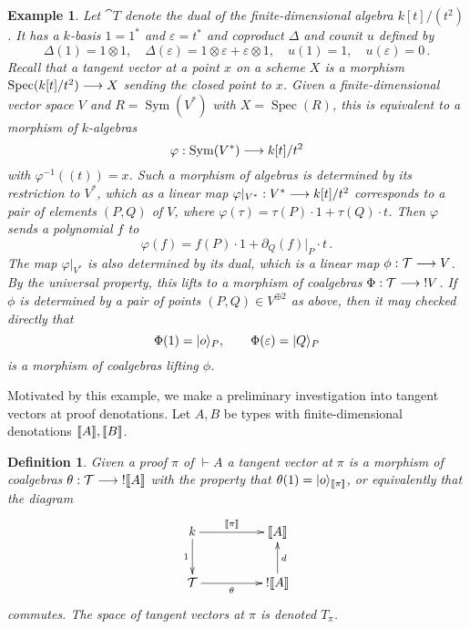 \documentclass[english,letter paper,12pt,reqno]{article}
\DeclarePairedDelimiter\ket{\lvert}{\rangle}
\theoremstyle{example}
\newtheorem{definition}[theorem]{Definition}
\newtheorem{example}[theorem]{Example}
\numberwithin{equation}{section}
\DeclareMathOperator{\Spec}{Spec}
\DeclareMathOperator{\Sym}{Sym}
\begin{document}
\begin{example}\label{example:tangent_coalgebra} Let $\cat{T}$ denote the dual of the finite-dimensional algebra $k[t]/(t^2)$. It has a $k$-basis $1 = 1^*$ and $\varepsilon = t^*$ and coproduct $\Delta$ and counit $u$ defined by
\[
\Delta(1) = 1 \otimes 1, \quad \Delta( \varepsilon ) = 1 \otimes \varepsilon + \varepsilon \otimes 1, \quad u(1) = 1, \quad u(\varepsilon) = 0\,.
\]
Recall that a tangent vector at a point $x$ on a scheme $X$ is a morphism $\Spec(k[t]/t^2) \lto X$ sending the closed point to $x$. Given a finite-dimensional vector space $V$ and $R = \Sym(V^*)$ with $X = \Spec(R)$, this is equivalent to a morphism of $k$-algebras
\[
\varphi: \Sym(V^*) \lto k[t]/t^2
\]
with $\varphi^{-1}( (t) ) = x$. Such a morphism of algebras is determined by its restriction to $V^*$, which as a linear map $\varphi|_{V^*}: V^* \longrightarrow k[t]/t^2$ corresponds to a pair of elements $(P, Q)$ of $V$, where $\varphi( \tau ) = \tau(P) \cdot 1 + \tau(Q) \cdot t$. Then $\varphi$ sends a polynomial $f$ to
\[
\varphi(f) = f(P) \cdot 1 + \partial_Q( f )|_P \cdot t\,.
\]
The map $\varphi|_{V^*}$ is also determined by its dual, which is a linear map $\phi: \mathcal{T} \longrightarrow V$. By the universal property, this lifts to a morphism of coalgebras $\Phi: \mathcal{T} \longrightarrow {!}V$. If $\phi$ is determined by a pair of points $(P,Q) \in V^{\oplus 2}$ as above, then it may checked directly that
\[
\Phi( 1 ) = \ket{o}_P, \qquad \Phi( \varepsilon ) = \ket{ Q }_P
\]
is a morphism of coalgebras lifting $\phi$.
\end{example}

Motivated by this example, we make a preliminary investigation into tangent vectors at proof denotations. Let $A,B$ be types with finite-dimensional denotations $\llbracket A \rrbracket, \llbracket B \rrbracket$.

\begin{definition} Given a proof $\pi$ of $\vdash A$ a \emph{tangent vector} at $\pi$ is a morphism of coalgebras $\theta: \mathcal{T} \longrightarrow {!} \llbracket A \rrbracket$ with the property that $\theta(1) = \ket{o}_{\den{\pi}}$, or equivalently that the diagram
\begin{equation}
\xymatrix@C+2pc{
k \ar[d]_-{1} \ar[r]^-{\den{\pi}} & \den{A}\\
\cat{T} \ar[r]_-{\theta} & {!} \den{A} \ar[u]_-{d}
}
\end{equation}
commutes. The space of tangent vectors at $\pi$ is denoted $T_{\pi}$.
\end{definition}
\end{document}
